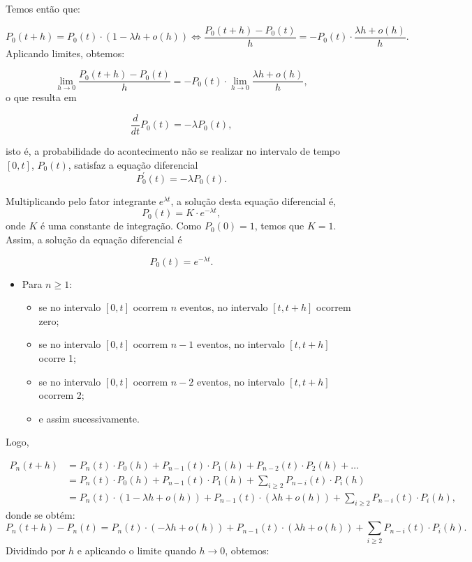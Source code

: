 \documentclass[
  11pt,
  a4paper,
]{book}
\providecommand{\tightlist}{%
  \setlength{\itemsep}{0pt}\setlength{\parskip}{0pt}}
\theoremstyle{definition}
\theoremstyle{definition}
\theoremstyle{definition}
\theoremstyle{definition}
\theoremstyle{remark}
\begin{document}
Temos então que:

\[P_0(t+h) = P_0(t) \cdot (1-\lambda h + o(h)) \iff \dfrac{P_0(t+h) -P_0(t)}{h} = - P_0(t) \cdot \dfrac{\lambda h +o(h)}{h}.\]
Aplicando limites, obtemos:

\[\lim\limits_{h \to 0}\dfrac{P_0(t+h) -P_0(t)}{h} = - P_0(t) \cdot \lim\limits_{h \to 0} \dfrac{\lambda h +o(h)}{h},\]
o que resulta em

\[\dfrac{d}{dt}P_0(t) = - \lambda P_0(t),\]

isto é, a probabilidade do acontecimento não se realizar no intervalo de tempo \([0,t]\), \(P_0(t)\), satisfaz a equação diferencial
\[\boxed{P^{'}_0(t)=-\lambda P_0(t).}\]

Multiplicando pelo fator integrante \(e^{\lambda t}\), a solução desta equação diferencial é,
\[P_0(t)=K \cdot e^{-\lambda t},\]
onde \(K\) é uma constante de integração. Como \(P_0(0)=1\), temos que \(K=1\). Assim, a solução da equação diferencial é

\[\boxed{P_0(t)=e^{-\lambda t}.}\]

\begin{itemize}
\item
  Para \(n \geq 1\):

  \begin{itemize}
  \tightlist
  \item
    se no intervalo \([0,t]\) ocorrem \(n\) eventos, no intervalo \([t,t+h]\) ocorrem zero;\\
  \item
    se no intervalo \([0,t]\) ocorrem \(n-1\) eventos, no intervalo \([t,t+h]\) ocorre 1;
  \item
    se no intervalo \([0,t]\) ocorrem \(n-2\) eventos, no intervalo \([t,t+h]\) ocorrem 2;
  \item
    e assim sucessivamente.
  \end{itemize}
\end{itemize}

Logo,

\begin{align*}
P_n(t+h) &= P_n(t) \cdot P_{0}(h) + P_{n-1}(t) \cdot P_{1}(h) + P_{n-2}(t) \cdot P_{2}(h) + \dots\\
         &= P_n(t) \cdot P_{0}(h) + P_{n-1}(t) \cdot P_{1}(h) + \sum\limits_{i \geq 2}P_{n-i}(t) \cdot P_{i}(h)\\
         &= P_n(t) \cdot (1-\lambda h + o(h)) + P_{n-1}(t) \cdot (\lambda h+o(h)) + \sum\limits_{i \geq 2}P_{n-i}(t) \cdot P_{i}(h),
\end{align*}
donde se obtém:
\[P_n(t+h)-P_n(t)=P_n(t) \cdot (-\lambda h+o(h)) + P_{n-1}(t) \cdot (\lambda h + o(h))+\sum\limits_{i \geq 2}P_{n-i}(t) \cdot P_{i}(h).\]
Dividindo por \(h\) e aplicando o limite quando \(h \to 0\), obtemos:
\end{document}
